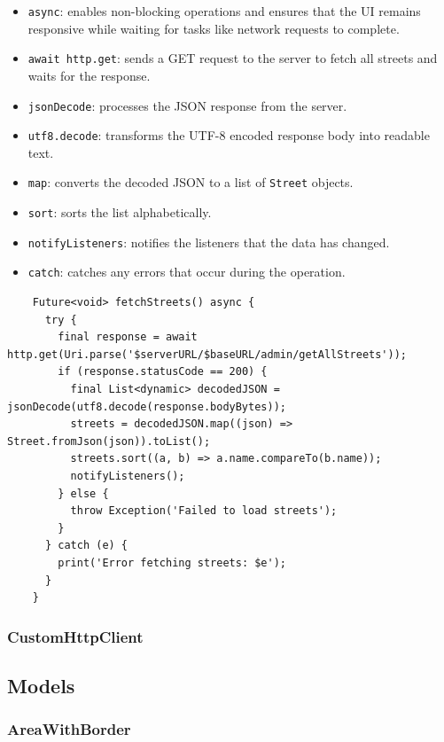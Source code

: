 \begin{itemize}
    \item \texttt{async}: enables non-blocking operations and ensures that the UI remains responsive while waiting for tasks like network requests to complete.
    \item \texttt{await http.get}: sends a GET request to the server to fetch all streets and waits for the response.
    \item \texttt{jsonDecode}: processes the JSON response from the server.
    \item \texttt{utf8.decode}: transforms the UTF-8 encoded response body into readable text.
    \item \texttt{map}: converts the decoded JSON to a list of \texttt{Street} objects.
    \item \texttt{sort}: sorts the list alphabetically.
    \item \texttt{notifyListeners}: notifies the listeners that the data has changed.
    \item \texttt{catch}: catches any errors that occur during the operation.
\end{itemize}
\lstset{style=mycsharp, caption=typical method in AdminAddressProvider}
\begin{lstlisting}
    Future<void> fetchStreets() async {
      try {
        final response = await http.get(Uri.parse('$serverURL/$baseURL/admin/getAllStreets'));
        if (response.statusCode == 200) {
          final List<dynamic> decodedJSON = jsonDecode(utf8.decode(response.bodyBytes));
          streets = decodedJSON.map((json) => Street.fromJson(json)).toList();
          streets.sort((a, b) => a.name.compareTo(b.name));
          notifyListeners();
        } else {
          throw Exception('Failed to load streets');
        }
      } catch (e) {
        print('Error fetching streets: $e');
      }
    }
\end{lstlisting}

\subsubsection{CustomHttpClient}

\subsection{Models}

\subsubsection{AreaWithBorder}

